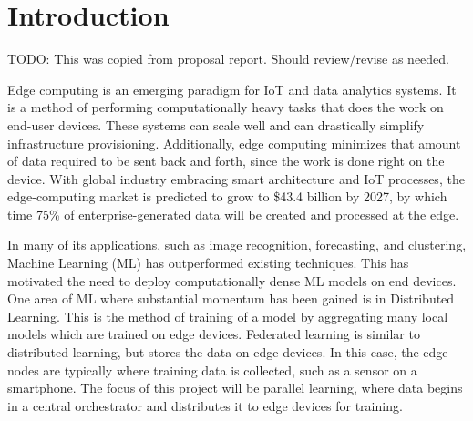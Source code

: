 \documentclass[../mthe-493-final-project.tex]{subfiles}
\begin{document}
    \chapter{Introduction}
    \label{ch:introduction}

    TODO: This was copied from proposal report. Should review/revise as needed.

    Edge computing is an emerging paradigm for IoT and data analytics systems. It is a method of performing computationally heavy tasks that does the work on end-user devices. These systems can scale well and can drastically simplify infrastructure provisioning. Additionally, edge computing minimizes that amount of data required to be sent back and forth, since the work is done right on the device. With global industry embracing smart architecture and IoT processes, the edge-computing market is predicted to grow to \$43.4 billion by 2027, by which time 75\% of enterprise-generated data will be created and processed at the edge.~\cite{noauthor_edge_2020}

    In many of its applications, such as image recognition, forecasting, and clustering, Machine Learning (ML) has outperformed existing techniques. This has motivated the need to deploy computationally dense ML models on end devices. One area of ML where substantial momentum has been gained is in Distributed Learning. This is the method of training of a model by aggregating many local models which are trained on edge devices. Federated learning is similar to distributed learning, but stores the data on edge devices. In this case, the edge nodes are typically where training data is collected, such as a sensor on a smartphone. The focus of this project will be parallel learning, where data begins in a central orchestrator and distributes it to edge devices for training.
\end{document}
